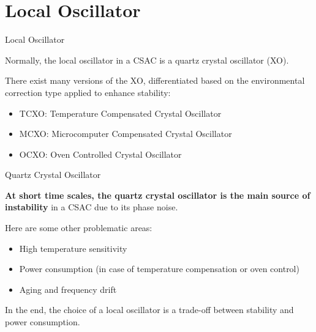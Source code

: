 \section{Local Oscillator}

\begin{frame}{Local Oscillator}

    Normally, the local oscillator in a CSAC is a quartz crystal oscillator (XO).

    There exist many versions of the XO, differentiated based on the environmental correction type applied to enhance stability:

    \begin{itemize}
        \item TCXO: Temperature Compensated Crystal Oscillator
        \item MCXO: Microcomputer Compensated Crystal Oscillator
        \item OCXO: Oven Controlled Crystal Oscillator
    \end{itemize}

\end{frame}



\begin{frame}{Quartz Crystal Oscillator}

    \textbf{At short time scales, the quartz crystal oscillator is the main source of instability} in a CSAC due to its phase noise.

    Here are some other problematic areas:

    \begin{itemize}
        \item High temperature sensitivity
        \item Power consumption (in case of temperature compensation or oven control)
        \item Aging and frequency drift
    \end{itemize}

    In the end, the choice of a local oscillator is a trade-off between stability and power consumption.

\end{frame}
